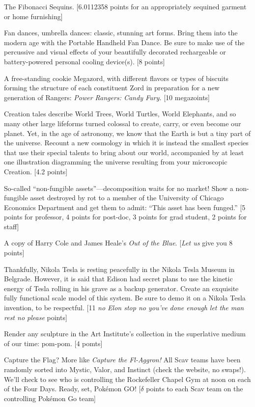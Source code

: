 \documentclass{book}
\begin{document}
\begin{list}{}{}
\item The Fibonacci Sequins. [6.0112358 points for an appropriately sequined garment or home furnishing]
\item Fan dances, umbrella dances: classic, stunning art forms. Bring them into the modern age with the Portable Handheld Fan Dance. Be sure to make use of the percussive and visual effects of your beautifully decorated rechargeable or battery-powered personal cooling device(s). [8 points]
\item A free-standing cookie Megazord, with different flavors or types of biscuits forming the structure of each constituent Zord in preparation for a new generation of Rangers: \textit{Power Rangers: Candy Fury.} [10 megazoints]
\item Creation tales describe World Trees, World Turtles, World Elephants, and so many other large lifeforms turned colossal to create, carry, or even become our planet. Yet, in the age of astronomy, we know that the Earth is but a tiny part of the universe. Recount a new cosmology in which it is instead the smallest species that use their special talents to bring about our world, accompanied by at least one illustration diagramming the universe resulting from your microscopic Creation. [4.2 points]
\item So-called “non-fungible assets”—decomposition waits for no market! Show a non-fungible asset destroyed by rot to a member of the University of Chicago Economics Department and get them to admit: “This asset has been funged.” [5 points for professor, 4 points for post-doc, 3 points for grad student, 2 points for staff]
\item A copy of Harry Cole and James Heale’s \textit{Out of the Blue}. [\textit{Let us} give you 8 points]
\item Thankfully, Nikola Tesla is resting peacefully in the Nikola Tesla Museum in Belgrade. However, it is said that Edison had secret plans to use the kinetic energy of Tesla rolling in his grave as a backup generator. Create an exquisite fully functional scale model of this system. Be sure to demo it on a Nikola Tesla invention, to be respectful. [11 \textit{no Elon stop no you’ve done enough let the man rest no please} points]
\item Render any sculpture in the Art Institute’s collection in the superlative medium of our time: pom-pom. [4 pomts]
\item Capture the Flag? More like \textit{Capture the Fl-Aggron!} All Scav teams have been randomly sorted into Mystic, Valor, and Instinct (check the website, no swaps!). We’ll check to see who is controlling the Rockefeller Chapel Gym at noon on each of the Four Days. Ready, set, Pokémon GO! [$\delta$ points to each Scav team on the controlling Pokémon Go team]

\end{list}
\end{document}
